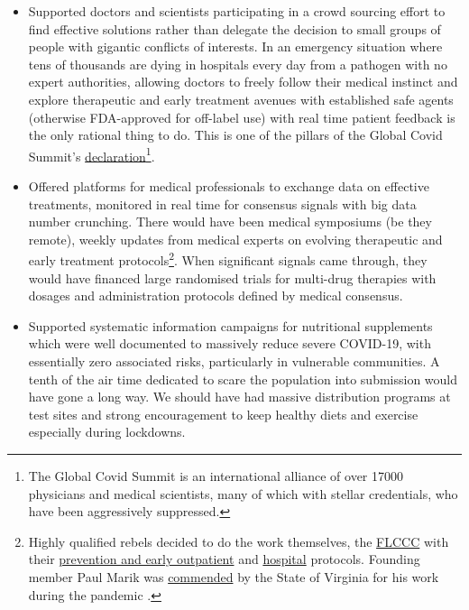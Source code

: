 \documentclass[11pt,a4paper,notitlepage]{report}
\begin{document}
\begin{itemize}
  \item Supported doctors and scientists participating in a crowd sourcing effort to find effective solutions rather than delegate the decision to small groups of people with gigantic conflicts of interests. In an emergency situation where tens of thousands are dying in hospitals every day from a pathogen with no expert authorities, allowing doctors to freely follow their medical instinct and explore therapeutic and early treatment avenues with established safe agents (otherwise FDA-approved for off-label use) with real time patient feedback is the only rational thing to do. This is one of the pillars of the Global Covid Summit's \href{https://doctorsandscientistsdeclaration.org/}{declaration}\footnote{The Global Covid Summit \cite{globalcovidsummit29102021} is an international alliance of over 17000 physicians and medical scientists, many of which with stellar credentials, who have been aggressively suppressed.}.
  \item Offered platforms for medical professionals to exchange data on effective treatments, monitored in real time for consensus signals with big data number crunching. There would have been medical symposiums (be they remote), weekly updates from medical experts on evolving therapeutic and early treatment protocols\footnote{Highly qualified rebels decided to do the work themselves, the \href{https://covid19criticalcare.com/about/}{FLCCC} \cite{flccc-website} with their \href{https://covid19criticalcare.com/wp-content/uploads/2020/11/FLCCC-Alliance-I-MASKplus-Protocol-ENGLISH.pdf}{prevention and early outpatient} \cite{flccc-imask} and \href{https://covid19criticalcare.com/wp-content/uploads/2021/01/FLCCC-Alliance-MATHplus-Protocol-ENGLISH.pdf}{hospital} \cite{flccc-math} protocols. Founding member Paul Marik was \href{https://covid19criticalcare.com/wp-content/uploads/2022/03/FLCCC-Statement-on-Marik-VA-Resolution.docx.pdf}{commended} by the State of Virginia for his work during the pandemic \cite{flccc-marik}.}. When significant signals came through, they would have financed large randomised trials for multi-drug therapies with dosages and administration protocols defined by medical consensus. 
  \item Supported systematic information campaigns for nutritional supplements which were well documented to massively reduce severe COVID-19, with essentially zero associated risks, particularly in vulnerable communities. A tenth of the air time dedicated to scare the population into submission would have gone a long way. We should have had massive distribution programs at test sites and strong encouragement to keep healthy diets and exercise especially during lockdowns. %

\end{itemize}
\end{document}
